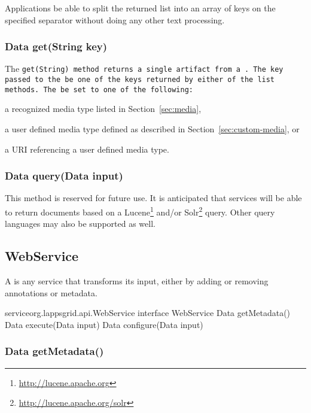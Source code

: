 Applications \must be able to split the returned list into an array of keys on the specified separator without doing any other text processing.

\subsubsection{Data get(String key)}

The \tt{get(String)} method returns a single artifact from a \source.  The key passed to the \source \must be one of the keys returned by either of the \tt{list} methods. The \discriminator \must be set to one of the following:
\begin{listing}
\item a recognized media type listed in Section~\ref{sec:media},
\item a user defined media type defined as described in Section~\ref{sec:custom-media}, or
\item a URI referencing a user defined media type.
\end{listing}

\subsubsection{Data query(Data input)}

This method is reserved for future use.  It is anticipated that \source services will be able to return documents based on a Lucene\footnote{\url{http://lucene.apache.org}} and/or Solr\footnote{\url{http://lucene.apache.org/solr}} query.  Other query languages may also be supported as well.



\subsection{WebService}\label{sub:WebService}

A \service is any service that transforms its input, either by adding or removing annotations or metadata.

\begin{groovy}{service}{org.lappsgrid.api.WebService}
	interface WebService {
		Data getMetadata()
		Data execute(Data input)
		Data configure(Data input)
	}
\end{groovy}

\subsubsection{Data getMetadata()}

